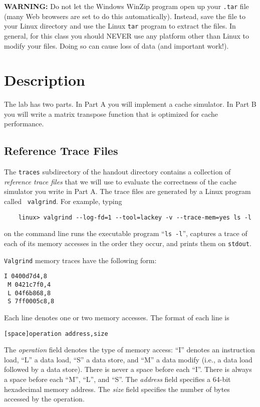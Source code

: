 \documentclass[11pt]{article}
\begin{document}
\textbf{WARNING:} Do not let the Windows WinZip program open up your
       {\tt .tar} file (many Web browsers are set to do this
       automatically).  Instead, save the file to your Linux directory
       and use the Linux {\tt tar} program to extract the files.  In
       general, for this class you should NEVER use any platform other
       than Linux to modify your files. Doing so can cause loss of
       data (and important work!).

\section{Description}
The lab has two parts. In Part A you will implement a cache
simulator. In Part B you will write a matrix transpose function that
is optimized for cache performance.

\subsection{Reference Trace Files}

The {\tt traces} subdirectory of the handout directory contains a
collection of {\em reference trace files} that we will use to evaluate the correctness
of the cache simulator you write in Part A.
The trace files are generated by a Linux program called {\tt
  valgrind}.  For example, typing
\begin{verbatim}
    linux> valgrind --log-fd=1 --tool=lackey -v --trace-mem=yes ls -l
\end{verbatim}
on the command line runs the executable program ``{\tt ls -l}'',
captures a trace of each of its memory accesses in the order they
occur, and prints them on \texttt{stdout}.

{\tt Valgrind} memory traces have the following form:
\begin{verbatim}
I 0400d7d4,8
 M 0421c7f0,4
 L 04f6b868,8
 S 7ff0005c8,8
\end{verbatim}
Each line denotes one or two memory accesses. The format of each line is
\begin{verbatim}
[space]operation address,size
\end{verbatim}
The {\em operation} field denotes the type of memory access: ``I''
  denotes an instruction load, ``L'' a data load, ``S''
  a data store, and ``M'' a data modify (i.e., a data load
  followed by a data store).  There is never a space before each ``I''.
  There is always a space before each ``M'', ``L'', and ``S''.
The {\em address} field specifies a 64-bit hexadecimal memory address.
The {\em size} field specifies the number of bytes accessed by the
operation.
\end{document}
